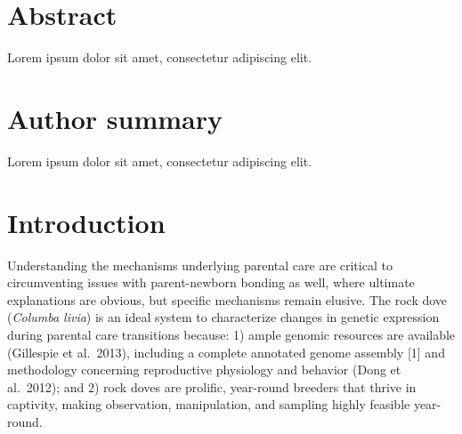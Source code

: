 \documentclass[10pt,letterpaper]{article}
\newcommand{\getIndex}[2]{
  \ForEach{,}{\IfEq{#1}{\thislevelitem}{\number\thislevelcount\ExitForEach}{}}{#2}
}
\newcommand{\getAff}[1]{
  \getIndex{#1}{UC Davis,UNH}
}
\begin{document}
\vspace*{0.2in}

\section*{Abstract}
Lorem ipsum dolor sit amet, consectetur adipiscing elit.

\section*{Author summary}
Lorem ipsum dolor sit amet, consectetur adipiscing elit.

\linenumbers

\hypertarget{introduction}{%
\section{Introduction}\label{introduction}}

Understanding the mechanisms underlying parental care are critical to
circumventing issues with parent-newborn bonding as well, where ultimate
explanations are obvious, but specific mechanisms remain elusive. The
rock dove (\emph{Columba livia}) is an ideal system to characterize
changes in genetic expression during parental care transitions because:
1) ample genomic resources are available (Gillespie et al.~2013),
including a complete annotated genome assembly {[}1{]} and methodology
concerning reproductive physiology and behavior (Dong et al.~2012); and
2) rock doves are prolific, year-round breeders that thrive in
captivity, making observation, manipulation, and sampling highly
feasible year-round.
\end{document}
